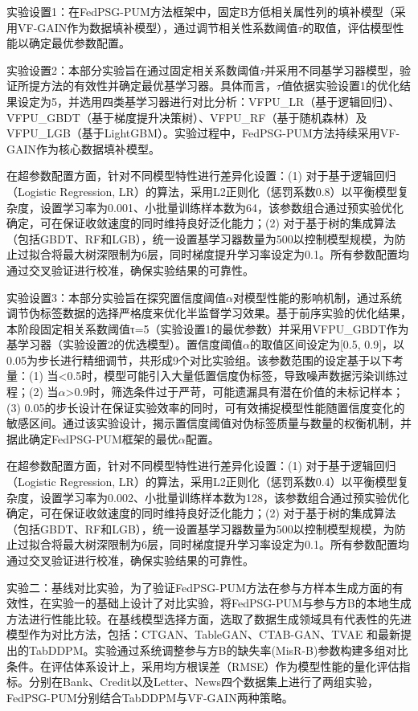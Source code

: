 实验设置1：在FedPSG-PUM方法框架中，固定B方低相关属性列的填补模型（采用VF-GAIN作为数据填补模型），通过调节相关性系数阈值$\tau$的取值，评估模型性能以确定最优参数配置。

实验设置2：本部分实验旨在通过固定相关系数阈值$\tau$并采用不同基学习器模型，验证所提方法的有效性并确定最优基学习器。具体而言，$\tau$值依据实验设置1的优化结果设定为5，并选用四类基学习器进行对比分析：VFPU\_LR（基于逻辑回归）、VFPU\_GBDT（基于梯度提升决策树）、VFPU\_RF（基于随机森林）及VFPU\_LGB（基于LightGBM）。实验过程中，FedPSG-PUM方法持续采用VF-GAIN作为核心数据填补模型。

在超参数配置方面，针对不同模型特性进行差异化设置：(1) 对于基于逻辑回归（Logistic Regression, LR）的算法，采用L2正则化（惩罚系数0.8）以平衡模型复杂度，设置学习率为0.001、小批量训练样本数为64，该参数组合通过预实验优化确定，可在保证收敛速度的同时维持良好泛化能力；(2) 对于基于树的集成算法（包括GBDT、RF和LGB），统一设置基学习器数量为500以控制模型规模，为防止过拟合将最大树深限制为6层，同时梯度提升学习率设定为0.1。所有参数配置均通过交叉验证进行校准，确保实验结果的可靠性。

实验设置3：本部分实验旨在探究置信度阈值$\alpha$对模型性能的影响机制，通过系统调节伪标签数据的选择严格度来优化半监督学习效果。基于前序实验的优化结果，本阶段固定相关系数阈值τ=5（实验设置1的最优参数）并采用VFPU\_GBDT作为基学习器（实验设置2的优选模型）。置信度阈值$\alpha$的取值区间设定为[0.5, 0.9]，以0.05为步长进行精细调节，共形成9个对比实验组。该参数范围的设定基于以下考量：(1) 当<0.5时，模型可能引入大量低置信度伪标签，导致噪声数据污染训练过程；(2) 当$\alpha$>0.9时，筛选条件过于严苛，可能遗漏具有潜在价值的未标记样本；(3) 0.05的步长设计在保证实验效率的同时，可有效捕捉模型性能随置信度变化的敏感区间。通过该实验设计，揭示置信度阈值对伪标签质量与数量的权衡机制，并据此确定FedPSG-PUM框架的最优$\alpha$配置。

在超参数配置方面，针对不同模型特性进行差异化设置：(1) 对于基于逻辑回归（Logistic Regression, LR）的算法，采用L2正则化（惩罚系数0.4）以平衡模型复杂度，设置学习率为0.002、小批量训练样本数为128，该参数组合通过预实验优化确定，可在保证收敛速度的同时维持良好泛化能力；(2) 对于基于树的集成算法（包括GBDT、RF和LGB），统一设置基学习器数量为500以控制模型规模，为防止过拟合将最大树深限制为6层，同时梯度提升学习率设定为0.1。所有参数配置均通过交叉验证进行校准，确保实验结果的可靠性。

实验二：基线对比实验，为了验证FedPSG-PUM方法在参与方样本生成方面的有效性，在实验一的基础上设计了对比实验，将FedPSG-PUM与参与方B的本地生成方法进行性能比较。在基线模型选择方面，选取了数据生成领域具有代表性的先进模型作为对比方法，包括：CTGAN、TableGAN、CTAB-GAN、TVAE 和最新提出的TabDDPM。实验通过系统调整参与方B的缺失率(MisR-B)参数构建多组对比条件。在评估体系设计上，采用均方根误差（RMSE）作为模型性能的量化评估指标。分别在Bank、Credit以及Letter、News四个数据集上进行了两组实验，FedPSG-PUM分别结合TabDDPM与VF-GAIN两种策略。

